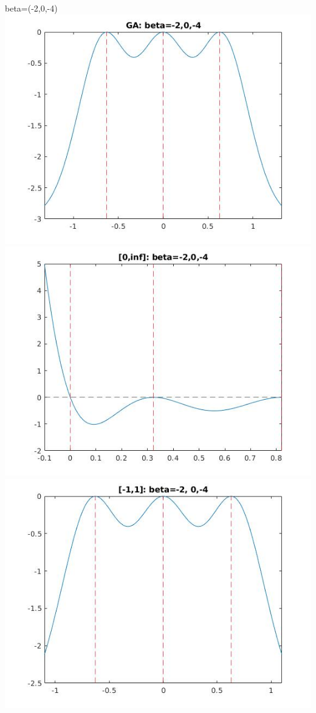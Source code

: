 \documentclass[11pt]{beamer}
\begin{document}
\begin{frame}{beta=(-2,0,-4)}
\includegraphics[scale=0.18]{quadplots/GA_4.jpg}
\includegraphics[scale=0.18]{quadplots/positive_4.jpg}
\includegraphics[scale=0.18]{quadplots/11_4.jpg}

\end{frame}
\end{document}
